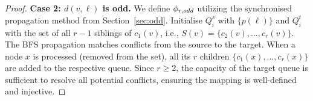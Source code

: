 \documentclass[10pt,a4paper]{amsart}
\begin{document}
\begin{proof}
\textbf{Case 2: $d(v,\ell)$ is odd.}
We define $\phi_{r, \textup{odd}}$ utilizing the synchronised propagation method from Section~\ref{sec:odd}. Initialise $Q_i^s$ with $\{p(\ell)\}$ and $Q_i^t$ with the set of all $r-1$ siblings of $c_1(v)$, i.e., $S(v) = \{c_2(v), \dots, c_r(v)\}$. The BFS propagation matches conflicts from the source to the target. When a node $x$ is processed (removed from the set), all its $r$ children $\{c_1(x), \dots, c_r(x)\}$ are added to the respective queue. Since $r \ge 2$, the capacity of the target queue is sufficient to resolve all potential conflicts, ensuring the mapping is well-defined and injective.
\end{proof}
\end{document}
